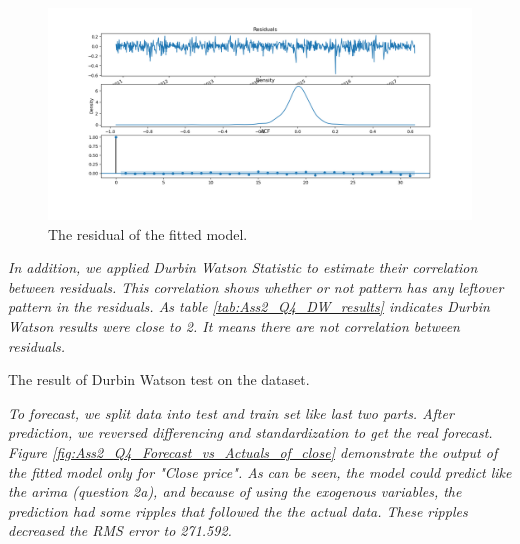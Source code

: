 \begin{figure}[H]
    \centering
    \begin{minipage}[b]{1\textwidth}
        \includegraphics[width=\textwidth]{manuscript/src/figures/Ass2/Ass2_Q4_residual_plot.png}
    \end{minipage}
    \caption{The residual of the fitted model.}
    \label{fig:Ass2_Q4_residual_plot}
\end{figure}


\textit{In addition, we applied Durbin Watson Statistic to estimate their correlation between residuals. This correlation shows whether or not pattern has any leftover pattern in the residuals. As table \ref{tab:Ass2_Q4_DW_results} indicates Durbin Watson results were close to 2. It means there are not correlation between residuals. } 

\begin{table}[H]
\centering
\caption{The result of Durbin Watson test on the dataset.}
\label{tab:Ass2_Q4_DW_results}

\end{table}




\textit{To forecast, we split data into test and train set like last two parts. After prediction, we reversed differencing and standardization to get the real forecast. Figure \ref{fig:Ass2_Q4_Forecast_vs_Actuals_of_close} demonstrate the output of the fitted model only for "Close price". As can be seen, the model could predict like the \gls{arima} (question 2a), and because of using the exogenous variables, the prediction had some ripples that followed the the actual data. These ripples decreased the RMS error to 271.592.} 


